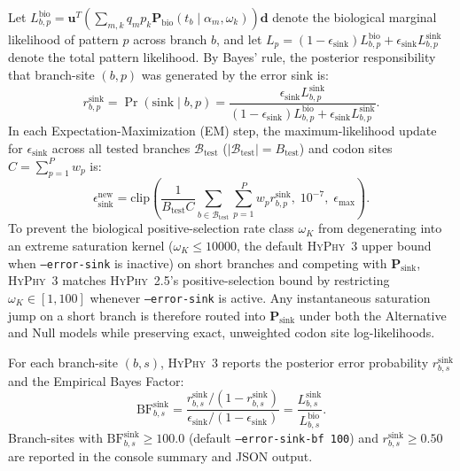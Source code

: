 \documentclass[11pt]{article}
\begin{document}
Let $L_{b,p}^{\text{bio}} = \bm{u}^T \left(\sum_{m,k} q_m p_k \bm{P}_{\text{bio}}(t_b \mid \alpha_m, \omega_k)\right) \bm{d}$ denote the biological marginal likelihood of pattern $p$ across branch $b$, and let $L_p = (1 - \epsilon_{\text{sink}}) L_{b,p}^{\text{bio}} + \epsilon_{\text{sink}} L_{b,p}^{\text{sink}}$ denote the total pattern likelihood. By Bayes' rule, the posterior responsibility that branch-site $(b, p)$ was generated by the error sink is:
\begin{equation}
    r_{b,p}^{\text{sink}} = \Pr(\text{sink} \mid b, p) = \frac{\epsilon_{\text{sink}} L_{b,p}^{\text{sink}}}{(1 - \epsilon_{\text{sink}}) L_{b,p}^{\text{bio}} + \epsilon_{\text{sink}} L_{b,p}^{\text{sink}}}.
    \label{eq:resp}
\end{equation}
In each Expectation-Maximization (EM) step, the maximum-likelihood update for $\epsilon_{\text{sink}}$ across all tested branches $\mathcal{B}_{\text{test}}$ ($|\mathcal{B}_{\text{test}}| = B_{\text{test}}$) and codon sites $C = \sum_{p=1}^P w_p$ is:
\begin{equation}
    \epsilon_{\text{sink}}^{\text{new}} = \text{clip}\left( \frac{1}{B_{\text{test}} C} \sum_{b \in \mathcal{B}_{\text{test}}} \sum_{p=1}^P w_p r_{b,p}^{\text{sink}}, \; 10^{-7}, \; \epsilon_{\max} \right).
    \label{eq:em_eps}
\end{equation}
To prevent the biological positive-selection rate class $\omega_K$ from degenerating into an extreme saturation kernel ($\omega_K \le 10000$, the default \textsc{HyPhy}~3 upper bound when \texttt{--error-sink} is inactive) on short branches and competing with $\bm{P}_{\text{sink}}$, \textsc{HyPhy}~3 matches \textsc{HyPhy}~2.5's positive-selection bound by restricting $\omega_K \in [1, 100]$ whenever \texttt{--error-sink} is active. Any instantaneous saturation jump on a short branch is therefore routed into $\bm{P}_{\text{sink}}$ under both the Alternative and Null models while preserving exact, unweighted codon site log-likelihoods.

For each branch-site $(b, s)$, \textsc{HyPhy}~3 reports the posterior error probability $r_{b,s}^{\text{sink}}$ and the Empirical Bayes Factor:
\begin{equation}
    \text{BF}_{b,s}^{\text{sink}} = \frac{r_{b,s}^{\text{sink}} / (1 - r_{b,s}^{\text{sink}})}{\epsilon_{\text{sink}} / (1 - \epsilon_{\text{sink}})} = \frac{L_{b,s}^{\text{sink}}}{L_{b,s}^{\text{bio}}}.
\end{equation}
Branch-sites with $\text{BF}_{b,s}^{\text{sink}} \ge 100.0$ (default \texttt{--error-sink-bf 100}) and $r_{b,s}^{\text{sink}} \ge 0.50$ are reported in the console summary and JSON output.
\end{document}
